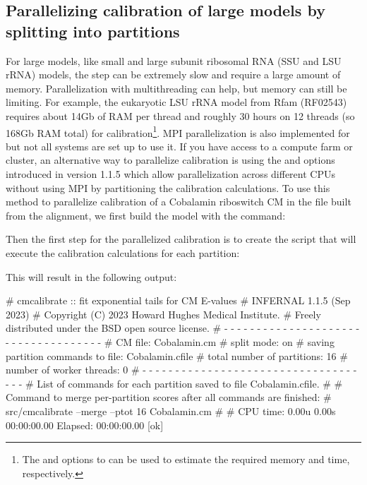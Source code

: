 \subsection{Parallelizing calibration of large models by splitting
  into partitions}

For large models, like small and large subunit ribosomal RNA (SSU and
LSU rRNA) models, the  step can be extremely slow
and require a large amount of memory. Parallelization with
multithreading can help, but memory can still be limiting. For
example, the eukaryotic LSU rRNA model from Rfam (RF02543) requires
about 14Gb of RAM per thread and roughly 30 hours on 12 threads (so
168Gb RAM total) for calibration\footnote{The  and
   options to  can be used to
  estimate the required memory and time, respectively.}.  MPI
parallelization is also implemented for  but not all
systems are set up to use it. If you have access to a compute farm or
cluster, an alternative way to parallelize calibration is
using the  and  options introduced in
version 1.1.5 which allow parallelization across different CPUs
without using MPI by partitioning the calibration calculations. To use
this method to parallelize calibration of a Cobalamin riboswitch CM
in the file built from the  alignment, we
first build the model with the command:


Then the first step for the parallelized calibration is to create the
script that will execute the calibration calculations for each partition:


This will result in the following output:

\begin{sreoutput}
# cmcalibrate :: fit exponential tails for CM E-values
# INFERNAL 1.1.5 (Sep 2023)
# Copyright (C) 2023 Howard Hughes Medical Institute.
# Freely distributed under the BSD open source license.
# - - - - - - - - - - - - - - - - - - - - - - - - - - - - - - - - - - - -
# CM file:                                     Cobalamin.cm
# split mode:                                  on
# saving partition commands to file:           Cobalamin.cfile
# total number of partitions:                  16
# number of worker threads:                    0
# - - - - - - - - - - - - - - - - - - - - - - - - - - - - - - - - - - - -
# List of commands for each partition saved to file Cobalamin.cfile.
#
# Command to merge per-partition scores after all commands are finished:
# src/cmcalibrate --merge --ptot 16 Cobalamin.cm
#
# CPU time: 0.00u 0.00s 00:00:00.00 Elapsed: 00:00:00.00
[ok]
\end{sreoutput}

